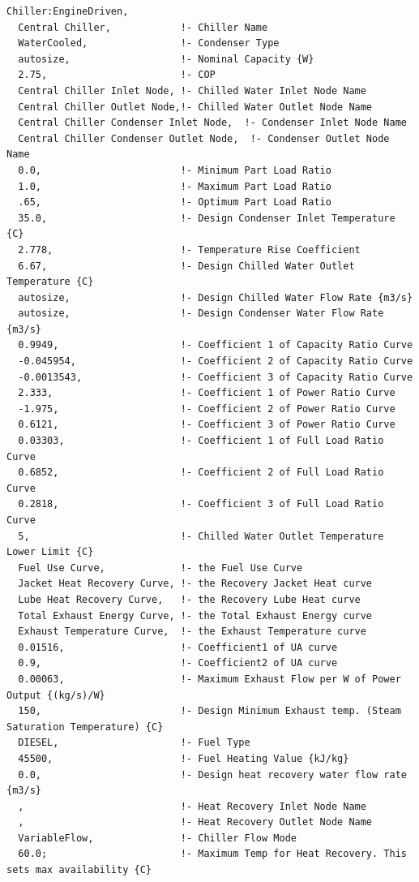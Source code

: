 \begin{lstlisting}
Chiller:EngineDriven,
  Central Chiller,            !- Chiller Name
  WaterCooled,                !- Condenser Type
  autosize,                   !- Nominal Capacity {W}
  2.75,                       !- COP
  Central Chiller Inlet Node, !- Chilled Water Inlet Node Name
  Central Chiller Outlet Node,!- Chilled Water Outlet Node Name
  Central Chiller Condenser Inlet Node,  !- Condenser Inlet Node Name
  Central Chiller Condenser Outlet Node,  !- Condenser Outlet Node Name
  0.0,                        !- Minimum Part Load Ratio
  1.0,                        !- Maximum Part Load Ratio
  .65,                        !- Optimum Part Load Ratio
  35.0,                       !- Design Condenser Inlet Temperature {C}
  2.778,                      !- Temperature Rise Coefficient
  6.67,                       !- Design Chilled Water Outlet Temperature {C}
  autosize,                   !- Design Chilled Water Flow Rate {m3/s}
  autosize,                   !- Design Condenser Water Flow Rate {m3/s}
  0.9949,                     !- Coefficient 1 of Capacity Ratio Curve
  -0.045954,                  !- Coefficient 2 of Capacity Ratio Curve
  -0.0013543,                 !- Coefficient 3 of Capacity Ratio Curve
  2.333,                      !- Coefficient 1 of Power Ratio Curve
  -1.975,                     !- Coefficient 2 of Power Ratio Curve
  0.6121,                     !- Coefficient 3 of Power Ratio Curve
  0.03303,                    !- Coefficient 1 of Full Load Ratio Curve
  0.6852,                     !- Coefficient 2 of Full Load Ratio Curve
  0.2818,                     !- Coefficient 3 of Full Load Ratio Curve
  5,                          !- Chilled Water Outlet Temperature Lower Limit {C}
  Fuel Use Curve,             !- the Fuel Use Curve
  Jacket Heat Recovery Curve, !- the Recovery Jacket Heat curve
  Lube Heat Recovery Curve,   !- the Recovery Lube Heat curve
  Total Exhaust Energy Curve, !- the Total Exhaust Energy curve
  Exhaust Temperature Curve,  !- the Exhaust Temperature curve
  0.01516,                    !- Coefficient1 of UA curve
  0.9,                        !- Coefficient2 of UA curve
  0.00063,                    !- Maximum Exhaust Flow per W of Power Output {(kg/s)/W}
  150,                        !- Design Minimum Exhaust temp. (Steam Saturation Temperature) {C}
  DIESEL,                     !- Fuel Type
  45500,                      !- Fuel Heating Value {kJ/kg}
  0.0,                        !- Design heat recovery water flow rate {m3/s}
  ,                           !- Heat Recovery Inlet Node Name
  ,                           !- Heat Recovery Outlet Node Name
  VariableFlow,               !- Chiller Flow Mode
  60.0;                       !- Maximum Temp for Heat Recovery. This sets max availability {C}
\end{lstlisting}

